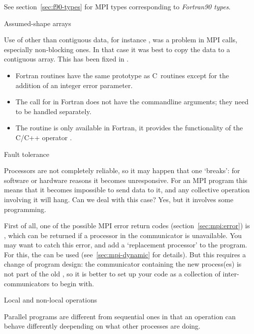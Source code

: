 See section~\ref{sec:f90-types} for MPI types corresponding to
\emph{Fortran90 types}.

 {Assumed-shape arrays}
\label{sec:mpif-shape}

Use of other than contiguous data, for instance , was a
problem in MPI calls, especially non-blocking ones. In that case it
was best to copy the data to a contiguous array. This has been fixed
in .

\begin{itemize}
\item Fortran routines have the same prototype as C~routines except for the addition
  of an integer error parameter.
\item The call for
   in Fortran
  does not have the commandline arguments;
  they need to be handled separately.
\item The routine  is only available in
  Fortran, it provides the functionality of the C/C++ operator
  .
\end{itemize}


 {Fault tolerance}
\label{mpi:tolerant}

Processors are not completely reliable, so it may happen that one
`breaks': for software or hardware reasons it becomes
unresponsive. For an MPI program this means that it becomes impossible
to send data to it, and any collective operation involving it will
hang. Can we deal with this case? Yes, but it involves some
programming.

First of all, one of the possible MPI error return codes
(section~\ref{sec:mpi:error}) is , which can be returned
if a processor in the communicator is unavailable. You may want to
catch this error, and add a `replacement processor' to the
program. For this, the  can be used
(see~\ref{sec:mpi-dynamic} for details).
%
But this requires a change of program design: the communicator
containing the new process(es) is not part of the
old , so it is better to set up your code as a
collection of inter-communicators to begin with.

 {Local and non-local operations}
\label{sec:mpi-local-non}

Parallel programs are different from sequential ones in that
an operation can behave differently deepending on what other processes are doing.

